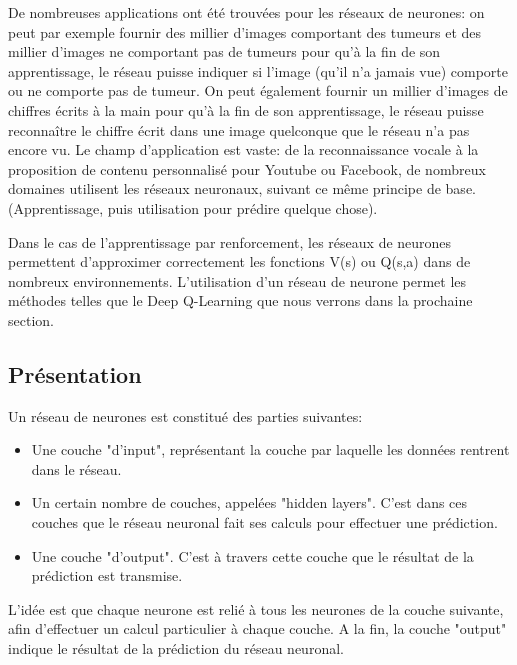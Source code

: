\documentclass[11pt,a4paper]{report}
\begin{document}
      \par De nombreuses applications ont été trouvées pour les réseaux de neurones: on peut par exemple fournir des millier d'images comportant des tumeurs et des millier d'images ne comportant pas de tumeurs pour qu'à la fin de son apprentissage, le réseau puisse indiquer si l'image (qu'il n'a jamais vue) comporte ou ne comporte pas de tumeur. On peut également fournir un millier d'images de chiffres écrits à la main pour qu'à la fin de son apprentissage, le réseau puisse reconnaître le chiffre écrit dans une image quelconque que le réseau n'a pas encore vu. Le champ d'application est vaste: de la reconnaissance vocale à la proposition de contenu personnalisé pour Youtube ou Facebook, de nombreux domaines utilisent les réseaux neuronaux, suivant ce même principe de base. (Apprentissage, puis utilisation pour prédire quelque chose). 
      
      \par Dans le cas de l'apprentissage par renforcement, les réseaux de neurones permettent d'approximer correctement les fonctions V(s) ou Q(s,a) dans de nombreux environnements. L'utilisation d'un réseau de neurone permet les méthodes telles que le Deep Q-Learning que nous verrons dans la prochaine section. 
      
  \subsection{Présentation}
  
    \par Un réseau de neurones est constitué des parties suivantes: 

    \renewcommand{\labelitemi}{\textbullet}
    \begin{itemize}
    \item Une couche "d'input", représentant la couche par laquelle les données rentrent dans le réseau. 
    \item Un certain nombre de couches, appelées "hidden layers". C'est dans ces couches que le réseau neuronal fait ses calculs pour effectuer une prédiction. 
    \item Une couche "d'output". C'est à travers cette couche que le résultat de la prédiction est transmise. 
    \end{itemize}    
    
    \par L'idée est que chaque neurone est relié à tous les neurones de la couche suivante, afin d'effectuer un calcul particulier à chaque couche. A la fin, la couche "output" indique le résultat de la prédiction du réseau neuronal. 
    
\end{document}
